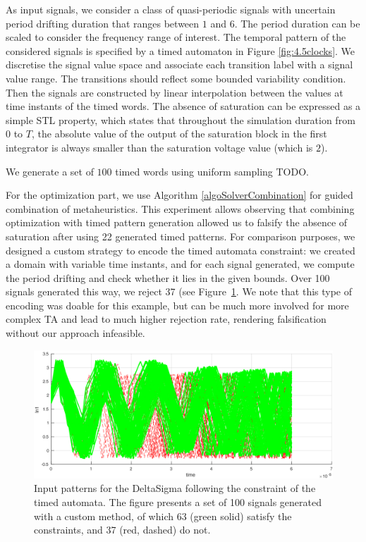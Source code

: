 As input signals, we consider a class of quasi-periodic signals with uncertain period drifting duration that ranges between $1$ and $6$. The period duration can be scaled to consider the frequency range of interest. The temporal pattern of the considered signals is specified by a timed automaton in Figure \ref{fig:4.5clocks}. We discretise the signal value space and associate each transition label with a signal value range. The transitions should reflect some bounded variability condition. Then the signals are constructed by linear interpolation between the values at time instants of the timed words. The absence of saturation can be expressed as a simple STL property, which states that throughout the simulation duration from $0$ to $T$, the absolute value of the output of the saturation block in the first integrator is always smaller than the saturation voltage value (which is $2$).

We generate a set of $100$ timed words using uniform sampling \cite{} {\color{red}TODO}. 

For the optimization part, we use Algorithm \ref{algoSolverCombination} for guided  combination of metaheuristics. 
This experiment allows observing that combining optimization with timed pattern generation allowed us to falsify the absence of saturation after using 22 generated timed patterns. For comparison purposes, we designed a custom strategy to encode the timed automata constraint: we created a domain with variable time instants, and for each signal generated, we compute the period drifting and check whether it lies in the given bounds. Over 100 signals generated this way, we reject 37 (see Figure~\ref{fig:reject}. We note that this type of encoding was doable for this example, but can be much more involved for more complex TA and lead to much higher rejection rate, rendering falsification without our approach infeasible. 

\begin{figure}
  \centering
  \includegraphics[width=\textwidth]{inputs_reject.png}
  \caption{Input patterns for the DeltaSigma following the constraint of the timed automata. The figure presents a set of 100 signals generated with a custom method, of which 63 (green solid) satisfy the constraints, and 37 (red, dashed) do not.}
  \label{fig:reject}
\end{figure}

